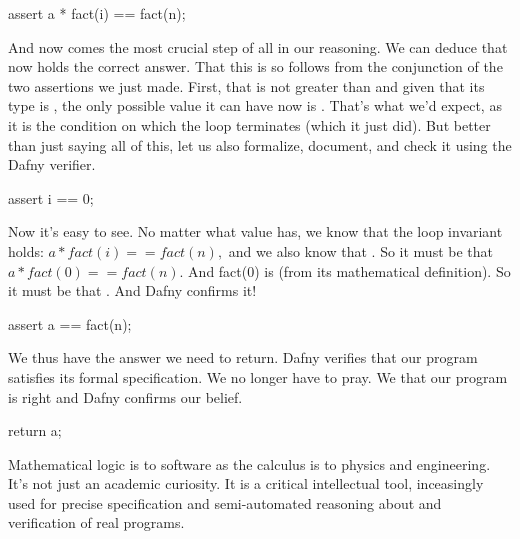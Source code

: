 \documentclass[letterpaper,10pt,english]{sphinxmanual}
\begin{document}
\begin{sphinxVerbatim}[commandchars=\\\{\}]
assert a * fact(i) == fact(n);
\end{sphinxVerbatim}

And now comes the most crucial step of all in our reasoning. We can
deduce that  now holds the correct answer. That this is so follows
from the conjunction of the two assertions we just made. First, that
 is not greater than  and given that its type is , the only
possible value it can have now is . That’s what we’d expect, as it
is the condition on which the loop terminates (which it just did). But
better than just saying all of this, let us also formalize, document,
and check it using the Dafny verifier.

\begin{sphinxVerbatim}[commandchars=\\\{\}]
assert i == 0;
\end{sphinxVerbatim}

Now it’s easy to see. No matter what value  has, we know that the
loop invariant holds: \(a * fact(i) == fact(n),\) and we also know
that . So it must be that \(a * fact(0) == fact(n).\) And
fact(0) is  (from its mathematical definition). So it must be that
. And Dafny confirms it!

\begin{sphinxVerbatim}[commandchars=\\\{\}]
assert a == fact(n);
\end{sphinxVerbatim}

We thus have the answer we need to return.  Dafny verifies that our
program satisfies its formal specification. We no longer have to
pray. We  that our program is right and Dafny confirms our
belief.

\begin{sphinxVerbatim}[commandchars=\\\{\}]
return a;
\end{sphinxVerbatim}

Mathematical logic is to software as the calculus is to physics and
engineering.  It’s not just an academic curiosity. It is a critical
intellectual tool, inceasingly used for precise specification and
semi-automated reasoning about and verification of real programs.
\end{document}
